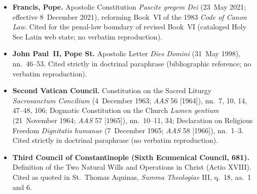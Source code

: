 \begin{itemize}
\item \textbf{Francis, Pope.} Apostolic Constitution \emph{Pascite gregem Dei} (23~May 2021; effective 8~December 2021), reforming Book~VI of the 1983 \emph{Code of Canon Law}. Cited for the penal-law boundary of revised Book~VI (cataloged Holy See Latin web state; no verbatim reproduction).
\item \textbf{John Paul~II, Pope St.} Apostolic Letter \emph{Dies Domini} (31~May 1998), nn.\ 46--53. Cited strictly in doctrinal paraphrase (bibliographic reference; no verbatim reproduction).
\item \textbf{Second Vatican Council.} Constitution on the Sacred Liturgy \emph{Sacrosanctum Concilium} (4~December 1963; \emph{AAS} 56 [1964]), nn.\ 7, 10, 14, 47--48, 106; Dogmatic Constitution on the Church \emph{Lumen gentium} (21~November 1964; \emph{AAS} 57 [1965]), nn.\ 10--11, 34; Declaration on Religious Freedom \emph{Dignitatis humanae} (7~December 1965; \emph{AAS} 58 [1966]), nn.\ 1--3. Cited strictly in doctrinal paraphrase (no verbatim reproduction).
\item \textbf{Third Council of Constantinople (Sixth Ecumenical Council, 681).} Definition of the Two Natural Wills and Operations in Christ (Actio XVIII). Cited as quoted in St.\ Thomas Aquinas, \emph{Summa Theologiae} III, q.\ 18, aa.\ 1 and 6.
\end{itemize}

